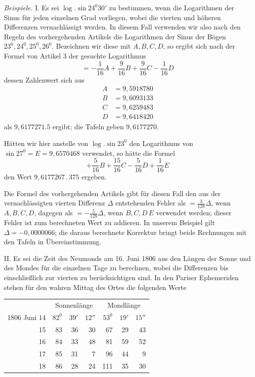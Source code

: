\emph{Beispiele.} I. Es sei \(\log.\sin 24^{0}30'\) zu bestimmen, wenn die Logarithmen der Sinus für jeden einzelnen Grad vorliegen, wobei die vierten und höheren Differenzen vernachlässigt werden. In
diesem Fall verwenden wir also nach den Regeln des vorhergehenden Artikels die Logarithmen der Sinus
der Bögen \(23^{0},24^{0},25^{0},26^{0}\). Bezeichnen wir diese mit \(A,B,C,D\), so ergibt sich nach der Formel von Artikel 3 der gesuchte Logarithmus
\[
=-\frac{1}{16}A+\frac{9}{16}B+\frac{9}{16}C-\frac{1}{16}D
\]
dessen Zahlenwert sich aus
\[
\begin{aligned}
A&=9{,}5918780\\
B&=9{,}6093133\\
C&=9{,}6259483\\
D&=9{,}6418420
\end{aligned}
\]
als \(9{,}6177271.5\) ergibt; die Tafeln geben \(9{,}6177270\).

Hätten wir hier anstelle von \(\log.\sin 23^{0}\) den Logarithmus von \(\sin 27^{0}=E=9{,}6570468\) verwendet, so hätte die Formel
\[
+\frac{5}{16}B+\frac{15}{16}C-\frac{5}{16}D+\frac{1}{16}E
\]
den Wert \(9{,}6177267\,.\,375\) ergeben.

Die Formel des vorhergehenden Artikels gibt für diesen Fall den aus der vernachlässigten vierten Differenz
\(\Delta\) entstehenden Fehler als \(=\frac{3}{128}\Delta\), wenn \(A,B,C,D\), dagegen als \(=-\frac{5}{128}\Delta\), wenn \(B,C,D\)\raisebox{-0.3ex}{:}\,\(E\) verwendet werden; dieser Fehler ist zum berechneten Wert zu addieren. In unserem Beispiel gilt
\(\Delta=-0{,}0000066\); die daraus berechnete Korrektur bringt beide Rechnungen mit den Tafeln in Übereinstimmung.

II. Es sei die Zeit des Neumonds am 16. Juni 1806 aus den Längen der Sonne und des Mondes für
die einzelnen Tage zu berechnen, wobei die Differenzen bis einschließlich zur vierten
zu berücksichtigen sind. In den Pariser Ephemeriden stehen für den wahren Mittag des Ortes die folgenden Werte

\begin{center}
\begin{tabular}{r@{\qquad}rrr@{\qquad}rrr}
&\multicolumn{3}{c}{Sonnenlänge}&\multicolumn{3}{c}{Mondlänge}\\
1806 Juni 14&\(82^{0}\)&\(39'\)&\(12''\)&\(53^{0}\)&\(19'\)&\(15''\)\\
15&83&36&30&67&29&43\\
16&84&33&48&81&59&52\\
17&85&31&7&96&44&9\\
18&86&28&24&111&35&30
\end{tabular}
\end{center}

